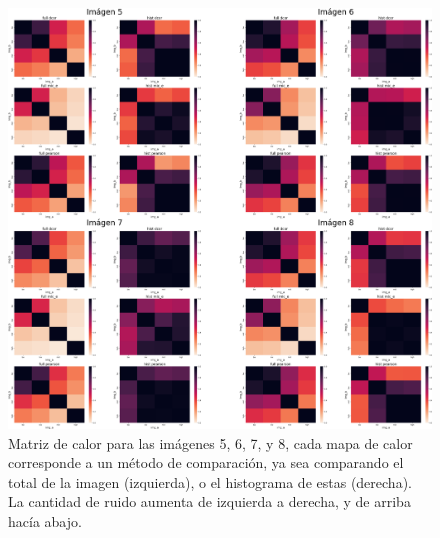 \begin{figure}
    \centering
    \includegraphics[width=\textwidth]{figuras/heatmaps/heatmaps_app_1.png}
    \caption{Matriz de calor para las im\'agenes 5, 6, 7, y 8, cada mapa de calor corresponde a un m\'etodo de comparaci\'on, ya sea comparando el total de la imagen (izquierda), o el histograma de estas (derecha). La cantidad de ruido aumenta de izquierda a derecha, y de arriba hacía abajo.}
\end{figure}


